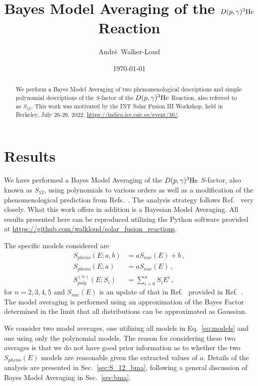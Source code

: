 \documentclass[prd,10pt,superscriptaddress,notitlepage,tightenlines,nofootinbib,floatfix]{revtex4-1}
\begin{document}
\title{Bayes Model Averaging of the $D(p,{\gamma})^3{\rm He}$ Reaction}


\author{Andr\'{e}~Walker-Loud}

\date{\today}

\begin{abstract}
We perform a Bayes Model Averaging of two phenomenological descriptions and simple polynomial descriptions of the $S$-factor of the $D(p,{\gamma})^3{\rm He}$ Reaction, also referred to as $S_{12}$.
This work was motivated by the INT Solar Fusion III Workshop, held in Berkeley, July 26-29, 2022, \url{https://indico.ice.csic.es/event/30/}.
\end{abstract}
\maketitle
\tableofcontents

\section{Results}
We have performed a Bayes Model Averaging of the $D(p,{\gamma})^3{\rm He}$ $S$-factor, also known as $S_{12}$, using polynomials to various orders as well as a modification of the phenomenological prediction from Refs.~\cite{Marcucci:2005zc,Marcucci:2015yla}.
The analysis strategy follows Ref.~\cite{Moscoso:2021xog} very closely.
What this work offers in addition is a Bayesian Model Averaging.
All results presented here can be reproduced utilizing the Python software provided at \url{https://github.com/walkloud/solar_fusion_reactions}.



The specific models considered are 
\begin{align}\label{eq:models}
S_{pheno}(E; a, b) &= a S_{nuc}(E) + b\, ,
\nonumber\\
S_{pheno}(E; a) &= a S_{nuc}(E)\, ,
\nonumber\\
S_{poly}^{(n)}(E; S_i) &= \sum_{i=0}^n S_i E^i\, ,
\end{align}
for $n=2,3,4,5$ and $S_{nuc}(E)$ is an update of that in Ref.~\cite{Marcucci:2005zc} provided in Ref.~\cite{Marcucci:2015yla}.
The model averaging is performed using an approximation of the Bayes Factor determined in the limit that all distributions can be approximated as Gaussian.

We consider two model averages, one utilizing all models in Eq.~\eqref{eq:models} and one using only the polynomial models.  The reason for considering these two averages is that we do not have good prior information as to whether the two $S_{pheno}(E)$ models are reasonable given the extracted values of $a$.
Details of the analysis are presented in Sec.~\ref{sec:S_12_bma}, following a general discussion of Bayes Model Averaging in Sec.~\ref{sec:bma}.
\end{document}
